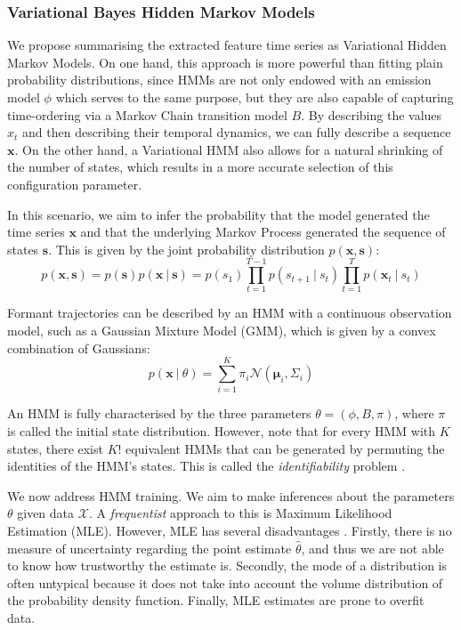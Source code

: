 \documentclass[pdftex,11pt,a4paper]{article}
\theoremstyle{definition}
\theoremstyle{remark}
\newcommand*{\V}[1]{\mathbf{#1}}%
\newcommand\given[1][]{\:#1\vert\:}
\begin{document}
\subsubsection{Variational Bayes Hidden Markov Models} \label{sub_hmms}
We propose summarising the extracted feature time series as Variational Hidden Markov Models. On one hand, this approach is more powerful than fitting plain probability distributions, since HMMs are not only endowed with an emission model $\phi$ which serves to the same purpose, but they are also capable of capturing time-ordering via a Markov Chain transition model $B$. By describing the values $x_t$ and then describing their temporal dynamics, we can fully describe a sequence $\V{x}$. On the other hand, a Variational HMM also allows for a natural shrinking of the number of states, which results in a more accurate selection of this configuration parameter.
\par In this scenario, we aim to infer the probability that the model generated the time series $\V{x}$ and that the underlying Markov Process generated the sequence of states $\V{s}$. This is given by the joint probability distribution $p(\V{x}, \V{s})$:
\begin{equation}\label{eq:hmm}
p(\V{x}, \V{s}) = p(\V{s})p(\V{x} \given \V{s}) = p(s_1)\prod_{t=1}^{T-1}p(s_{t+1}\given s_t)\prod_{t=1}^Tp(\V{x}_t \given s_t)
\end{equation} 
\par Formant trajectories can be described by an HMM with a continuous observation model, such as a Gaussian Mixture Model (GMM), which is given by a convex combination of Gaussians:
\begin{equation} \label{eq:mixmod}
p(\V{x} \given \theta ) = \sum_{i=1}^K\pi_i \mathcal{N}(\V{\mu}_i, \Sigma_i) 
\end{equation}
\par An HMM is fully characterised by the three parameters $\theta = (\phi, B, \pi)$, where $\pi$ is called the initial state distribution. However, note that for every HMM with $K$ states, there exist $K!$ equivalent HMMs that can be generated by permuting the identities of the HMM's states. This is called the \emph{identifiability} problem \cite{Bishop2006}.
\par We now address HMM training. We aim to make inferences about the parameters $\theta$ given data $\mathcal{X}$. A \emph{frequentist} approach to this is Maximum Likelihood Estimation (MLE). However, MLE has several disadvantages \cite{Murphy2012}. Firstly, there is no measure of uncertainty regarding the point estimate $\hat{\theta}$, and thus we are not able to know how trustworthy the estimate is. Secondly, the mode of a distribution is often untypical \cite{Murphy2012} because it does not take into account the volume distribution of the probability density function. Finally, MLE estimates are prone to overfit data. 
\end{document}

